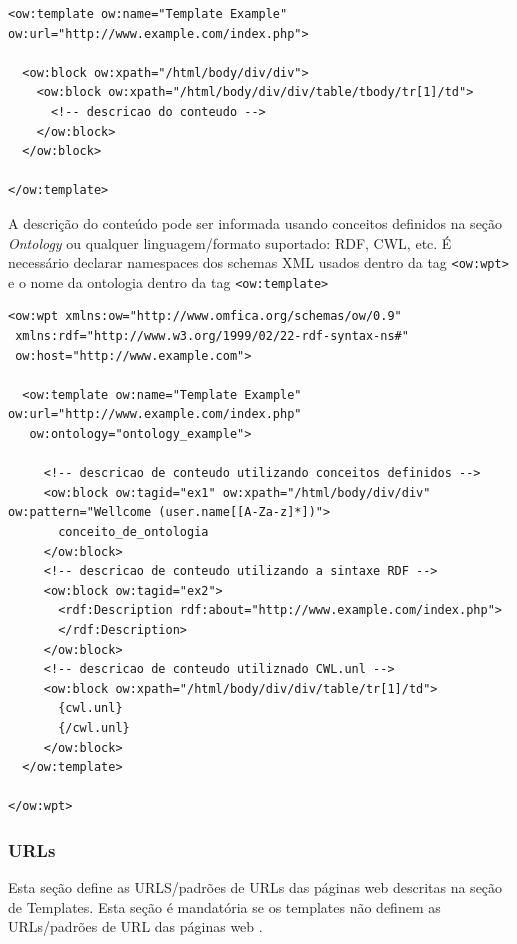 \begin{lstlisting}
<ow:template ow:name="Template Example" ow:url="http://www.example.com/index.php">

  <ow:block ow:xpath="/html/body/div/div">
    <ow:block ow:xpath="/html/body/div/div/table/tbody/tr[1]/td">
      <!-- descricao do conteudo -->
    </ow:block>
  </ow:block>
  
</ow:template>
\end{lstlisting}

A descrição do conteúdo pode ser informada usando conceitos definidos na seção \emph{Ontology} ou qualquer linguagem/formato suportado: RDF, CWL, etc. É necessário declarar namespaces dos schemas XML usados dentro da tag \texttt{<ow:wpt>} e o nome da ontologia dentro da tag \texttt{<ow:template>}

\pagebreak
{}
\begin{lstlisting}
<ow:wpt xmlns:ow="http://www.omfica.org/schemas/ow/0.9"
 xmlns:rdf="http://www.w3.org/1999/02/22-rdf-syntax-ns#"
 ow:host="http://www.example.com">

  <ow:template ow:name="Template Example" ow:url="http://www.example.com/index.php"
   ow:ontology="ontology_example">

     <!-- descricao de conteudo utilizando conceitos definidos -->
     <ow:block ow:tagid="ex1" ow:xpath="/html/body/div/div" ow:pattern="Wellcome (user.name[[A-Za-z]*])">
       conceito_de_ontologia
     </ow:block>
     <!-- descricao de conteudo utilizando a sintaxe RDF -->
     <ow:block ow:tagid="ex2">
       <rdf:Description rdf:about="http://www.example.com/index.php">
       </rdf:Description>
     </ow:block>
     <!-- descricao de conteudo utiliznado CWL.unl -->
     <ow:block ow:xpath="/html/body/div/div/table/tr[1]/td">
       {cwl.unl}
       {/cwl.unl}
     </ow:block>
  </ow:template>

</ow:wpt>
\end{lstlisting}

\subsubsection{URLs}

Esta seção define as URLS/padrões de URLs das páginas web descritas na seção de Templates. Esta seção é mandatória se os templates não definem as URLs/padrões de URL das páginas web \cite{wpt}.

